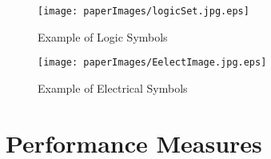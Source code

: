 \begin{figure}[]\centering

		\texttt{[image: paperImages/logicSet.jpg.eps]}	

	\caption[Symbols in LD-DB]{Example of Logic Symbols}
	\label{fig:LogicSet}
\end{figure}
\begin{figure}[]\centering

		\texttt{[image: paperImages/EelectImage.jpg.eps]}	

	\caption[Symbols in EL-DB]{Example of Electrical Symbols}
	\label{fig:ElectSet}
\end{figure}
\begin{table}
\begin{center}
\caption[Datasets Comparisons]{Datasets Comparisons} 

\label{tab:datasets}

\end{center}
\end{table}


\section{Performance Measures }
\label{sec:PerformanceMeasures}

